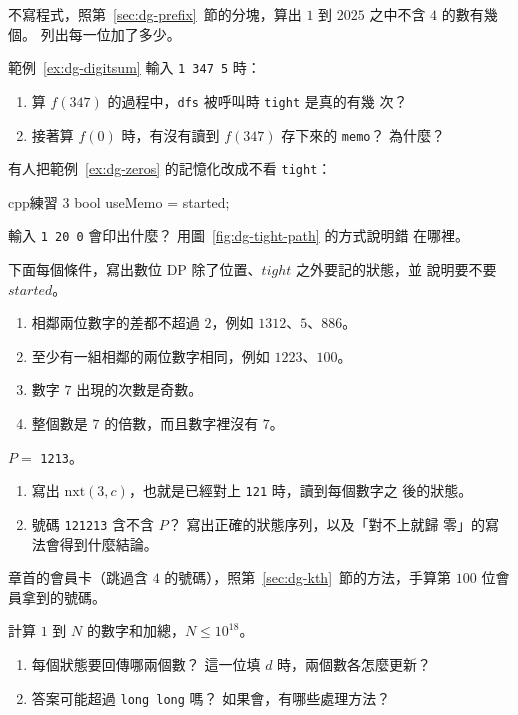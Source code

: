 \begin{drills}[label=drills:dg]
\item 不寫程式，照第~\ref{sec:dg-prefix}~節的分塊，算出 $1$ 到 $2025$ 之中不含
$4$ 的數有幾個。 列出每一位加了多少。

\item 範例~\ref{ex:dg-digitsum} 輸入 \texttt{1 347 5} 時：
\begin{enumerate}
\item 算 $f(347)$ 的過程中，\texttt{dfs} 被呼叫時 \texttt{tight} 是真的有幾
次？
\item 接著算 $f(0)$ 時，有沒有讀到 $f(347)$ 存下來的 \texttt{memo}？ 為什麼？
\end{enumerate}

\item 有人把範例~\ref{ex:dg-zeros} 的記憶化改成不看 \texttt{tight}：
\begin{code}{cpp}{練習 3}
bool useMemo = started;
\end{code}
輸入 \texttt{1 20 0} 會印出什麼？ 用圖~\ref{fig:dg-tight-path} 的方式說明錯
在哪裡。

\item 下面每個條件，寫出數位 DP 除了位置、$\mathit{tight}$ 之外要記的狀態，並
說明要不要 $\mathit{started}$。
\begin{enumerate}
\item 相鄰兩位數字的差都不超過 $2$，例如 $1312$、$5$、$886$。
\item 至少有一組相鄰的兩位數字相同，例如 $1223$、$100$。
\item 數字 $7$ 出現的次數是奇數。
\item 整個數是 $7$ 的倍數，而且數字裡沒有 $7$。
\end{enumerate}

\item $P =$ \texttt{1213}。
\begin{enumerate}
\item 寫出 $\mathrm{nxt}(3, c)$，也就是已經對上 \texttt{121} 時，讀到每個數字之
後的狀態。
\item 號碼 \texttt{121213} 含不含 $P$？ 寫出正確的狀態序列，以及「對不上就歸
零」的寫法會得到什麼結論。
\end{enumerate}

\item 章首的會員卡（跳過含 $4$ 的號碼），照第~\ref{sec:dg-kth}~節的方法，手算第
$100$ 位會員拿到的號碼。

\item 計算 $1$ 到 $N$ 的數字和加總，$N \le 10^{18}$。
\begin{enumerate}
\item 每個狀態要回傳哪兩個數？ 這一位填 $d$ 時，兩個數各怎麼更新？
\item 答案可能超過 \texttt{long long} 嗎？ 如果會，有哪些處理方法？
\end{enumerate}
\end{drills}


